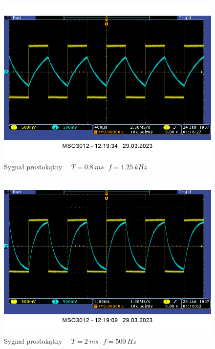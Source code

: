\documentclass[14pt, table]{extarticle}
\begin{document}
\begin{figure}[H]
\includegraphics[scale=0.65]{RC-square-0_8ms}
\centering
\captionsetup{labelformat=empty}
\caption{Sygnał prostokątny \ \ $T = 0.8 \ ms \ \ \ f = 1.25 \ kHz$}
\end{figure}

\begin{figure}[H]
\includegraphics[scale=0.65]{RC-square-2ms}
\centering
\captionsetup{labelformat=empty}
\caption{Sygnał prostokątny \ \ $T = 2 \ ms \ \ \ f = 500 \ Hz$}
\end{figure}
\end{document}
